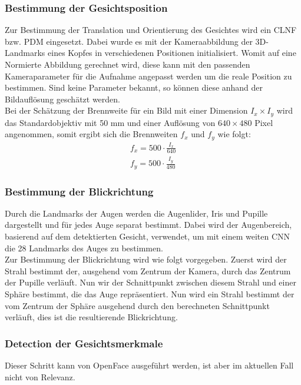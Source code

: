 \subsubsection{Bestimmung der Gesichtsposition}
Zur Bestimmung der Translation und Orientierung des Gesichtes wird ein CLNF bzw. PDM eingesetzt. Dabei wurde es mit der Kameraabbildung der 3D-Landmarks eines Kopfes in verschiedenen Positionen initialisiert. Womit auf eine Normierte Abbildung gerechnet wird, diese kann mit den passenden Kameraparameter für die Aufnahme angepasst werden um die reale Position zu bestimmen. Sind keine Parameter bekannt, so können diese anhand der Bildauflösung geschätzt werden.\\
Bei der Schätzung der Brennweite für ein Bild mit einer Dimension $I_x\times I_y$ wird das Standardobjektiv mit 50 mm und einer Auflösung von $640 \times 480$ Pixel angenommen, somit ergibt sich die Brennweiten $f_x$ und $f_y$ wie folgt:
\begin{align*}
f_x = 500\cdot \frac{I_x}{640}\\
f_y = 500\cdot \frac{I_y}{480}
\end{align*}
\subsubsection{Bestimmung der Blickrichtung}
\label{OpenFace_Blickrichtung}
Durch die Landmarks der Augen werden die Augenlider, Iris und Pupille dargestellt und für jedes Auge separat bestimmt. Dabei wird der Augenbereich, basierend auf dem detektierten Gesicht, verwendet, um mit einem weiten CNN die 28 Landmarks des Auges zu bestimmen.\\
Zur Bestimmung der Blickrichtung wird wie folgt vorgegeben. Zuerst wird der Strahl bestimmt der, ausgehend vom Zentrum der Kamera, durch das Zentrum der Pupille verläuft. Nun wir der Schnittpunkt zwischen diesem Strahl und einer Sphäre bestimmt, die das Auge repräsentiert. Nun wird ein Strahl bestimmt der vom Zentrum der Sphäre ausgehend durch den berechneten Schnittpunkt verläuft, dies ist die resultierende Blickrichtung.
\subsubsection{Detection der Gesichtsmerkmale}
Dieser Schritt kann von OpenFace ausgeführt werden, ist aber  im aktuellen Fall nicht von Relevanz.
